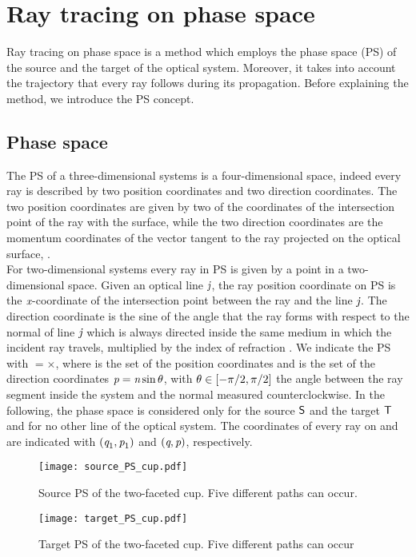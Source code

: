 \chapter{Ray tracing on phase space} \label{chap:PS}
Ray tracing on phase space is a method which employs the phase space (PS) of the source and the target of the optical system.
Moreover, it takes into account the trajectory that every ray follows during its propagation.
Before explaining the method, we introduce the PS concept.
\section{Phase space}\label{sec:PSconcept}
The PS of a three-dimensional systems is a four-dimensional space, indeed every ray is described by two position coordinates
and two direction coordinates.
The two position coordinates are given by two of the coordinates of the intersection point of the ray with the surface, while the two direction coordinates are
the momentum coordinates of the vector tangent to the ray projected on the optical surface, \cite{wolf2004geometric}.
\\ \indent For two-dimensional systems every ray in PS is given by a point in a two-dimensional space.
Given an optical line $\textit{j}$, the ray position coordinate on PS is the $\textit{x}$-coordinate of the intersection point between the ray and the line $\textit{j}$. The direction coordinate is the sine of the angle that the ray forms with respect to the normal \vect{$\boldsymbol{\nu}$} of line $\textit{j}$ which  is always directed inside the same medium in which the incident ray travels, multiplied by the index of refraction \n. We indicate the PS with $=$$\times$,
where  is the set of the position coordinates  and  is the set of the direction coordinates $\textit{p}=\textit{n}\sin{\theta}$, with $\theta\in[-\pi/2, \pi/2]$ the angle between the ray segment inside the system and the normal measured counterclockwise.
In the following, the phase space is considered only for the source $\textsf{S}$ and the target $\textsf{T}$ and for no other line of the optical system.
The coordinates of every ray on  and  are indicated with $(\textit{q}_1,\textit{p}_1)$ and $(\textit{q},\textit{p})$, respectively.\\ \indent
\begin{figure}[h]
  \begin{minipage}[]{0.49\textwidth}
\centering
    \texttt{[image: source\_PS\_cup.pdf]}
    \caption{Source PS of the two-faceted cup. Five different paths can occur.}
    \label{fig:sourcePS}
  \end{minipage}
\hspace{0.2cm}
  \begin{minipage}[]{0.49\textwidth}
\centering
    \texttt{[image: target\_PS\_cup.pdf]}
  \caption{Target PS of the two-faceted cup. Five different paths can occur}
   \label{fig:targetPS}
 \end{minipage}
\end{figure}
